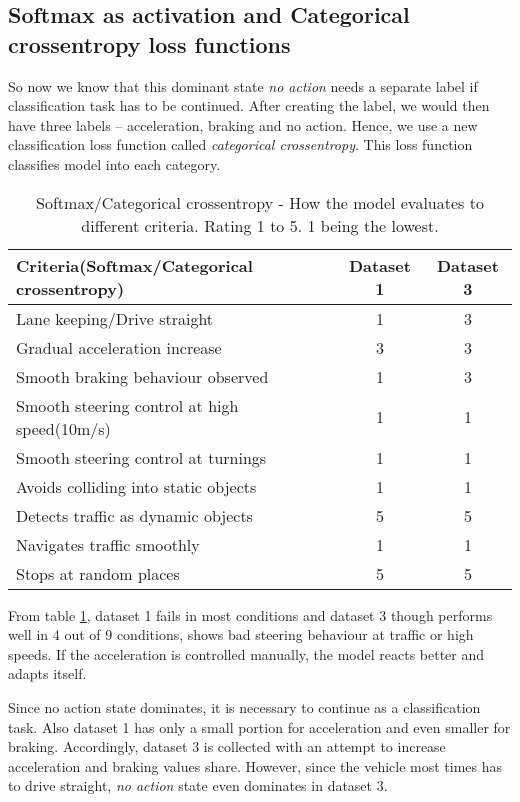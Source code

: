 \subsection{Softmax as activation and Categorical crossentropy loss functions}
So now we know that this dominant state \textit{no action} needs a separate label if
classification task has to be continued. After creating the label, we would then have
three labels -- acceleration, braking and no action. Hence, we use a new classification
loss function called \textit{categorical crossentropy}. This loss function classifies
model into each category.

\begin{table}[h]
    \centering
\begin{tabular}{lcc}
    \toprule
    Criteria(Softmax/Categorical crossentropy) & Dataset 1 & Dataset 3 \\\midrule
    Lane keeping/Drive straight  & 1 & 3  \\
    Gradual acceleration increase & 3 & 3\\
    Smooth braking behaviour observed & 1 & 3 \\
    Smooth steering control at high speed(10m/s) & 1 & 1 \\
    Smooth steering control at turnings & 1 & 1\\
    Avoids colliding into static objects & 1 & 1 \\
    Detects traffic as dynamic objects & 5 & 5\\
    Navigates traffic smoothly & 1 & 1\\
    Stops at random places & 5 & 5 \\\bottomrule
\end{tabular}
\caption{Softmax/Categorical crossentropy - How the model evaluates to different criteria.
Rating 1 to 5. 1 being the lowest.}
\label{table:softmaxandcce}
\end{table}

From table \ref{table:softmaxandcce}, dataset 1 fails in most conditions and dataset 3
though performs well in 4 out of 9 conditions, shows bad steering behaviour at traffic or high
speeds. If the acceleration is controlled manually, the model reacts better and adapts
itself.

Since no action state dominates, it is necessary to continue as a classification task.
Also dataset 1 has only a small portion for acceleration and even smaller for
braking. Accordingly, dataset 3 is collected with an attempt to increase acceleration
and braking values share. However, since the vehicle most times has to drive straight, \textit{no action} state even dominates in dataset 3.

